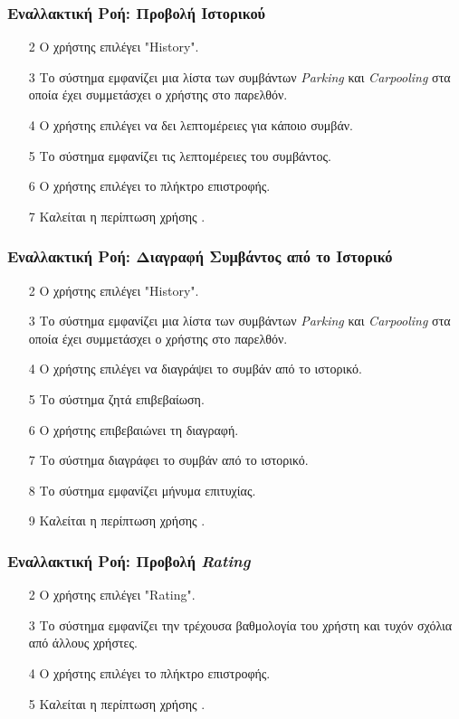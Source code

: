 \subsubsection{Εναλλακτική Ροή: Προβολή Ιστορικού}

\begin{enumerate}
    \item[2] Ο χρήστης επιλέγει "History".
    \item[3] Το σύστημα εμφανίζει μια λίστα των συμβάντων \textit{Parking} και
        \textit{Carpooling} στα οποία έχει συμμετάσχει ο χρήστης στο παρελθόν.
    \item[4] Ο χρήστης επιλέγει να δει λεπτομέρειες για κάποιο συμβάν.
    \item[5] Το σύστημα εμφανίζει τις λεπτομέρειες του συμβάντος.
    \item[6] Ο χρήστης επιλέγει το πλήκτρο επιστροφής.
    \item[7] Καλείται η περίπτωση χρήσης .
\end{enumerate}

\subsubsection{Εναλλακτική Ροή: Διαγραφή Συμβάντος από το Ιστορικό}

\begin{enumerate}
    \item[2] Ο χρήστης επιλέγει "History".
    \item[3] Το σύστημα εμφανίζει μια λίστα των συμβάντων \textit{Parking} και
        \textit{Carpooling} στα οποία έχει συμμετάσχει ο χρήστης στο παρελθόν.
    \item[4] Ο χρήστης επιλέγει να διαγράψει το συμβάν από το ιστορικό.
    \item[5] Το σύστημα ζητά επιβεβαίωση.
    \item[6] Ο χρήστης επιβεβαιώνει τη διαγραφή.
    \item[7] Το σύστημα διαγράφει το συμβάν από το ιστορικό.
    \item[8] Το σύστημα εμφανίζει μήνυμα επιτυχίας.
    \item[9] Καλείται η περίπτωση χρήσης .
\end{enumerate}

\subsubsection{Εναλλακτική Ροή: Προβολή \textit{Rating}}

\begin{enumerate}
    \item[2] Ο χρήστης επιλέγει "Rating".
    \item[3] Το σύστημα εμφανίζει την τρέχουσα βαθμολογία του χρήστη και τυχόν
        σχόλια από άλλους χρήστες.
    \item[4] Ο χρήστης επιλέγει το πλήκτρο επιστροφής.
    \item[5] Καλείται η περίπτωση χρήσης .
\end{enumerate}
